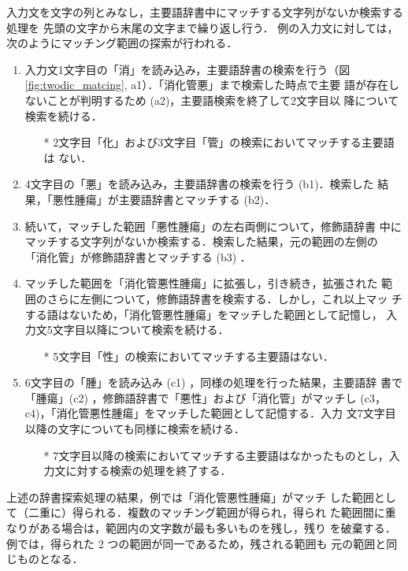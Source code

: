 \documentclass[japanese]{jnlp_1.4}
\begin{document}
入力文を文字の列とみなし，主要語辞書中にマッチする文字列がないか検索する処理を
先頭の文字から末尾の文字まで繰り返し行う．
例の入力文に対しては，次のようにマッチング範囲の探索が行われる．
\begin{enumerate}
\item 入力文1文字目の「消」を読み込み，主要語辞書の検索を行う（図 \ref{fig:twodic_matcing}, a1）．「消化管悪」まで検索した時点で主要
  語が存在しないことが判明するため (a2)，主要語検索を終了して2文字目以
  降について検索を続ける．
 \begin{itemize}
 \item[*] 2文字目「化」および3文字目「管」の検索においてマッチする主要語は
   ない．
 \end{itemize}
\item 4文字目の「悪」を読み込み，主要語辞書の検索を行う (b1)．検索した
  結果，「悪性腫瘍」が主要語辞書とマッチする (b2)．
\item 続いて，マッチした範囲「悪性腫瘍」の左右両側について，修飾語辞書
  中にマッチする文字列がないか検索する．検索した結果，元の範囲の左側の
  「消化管」が修飾語辞書とマッチする (b3) ．
\item マッチした範囲を「消化管悪性腫瘍」に拡張し，引き続き，拡張された
  範囲のさらに左側について，修飾語辞書を検索する．しかし，これ以上マッ
  チする語はないため，「消化管悪性腫瘍」をマッチした範囲として記憶し，
  入力文5文字目以降について検索を続ける．
 \begin{itemize}
 \item[*] 5文字目「性」の検索においてマッチする主要語はない．
 \end{itemize}
\item 6文字目の「腫」を読み込み (c1) ，同様の処理を行った結果，主要語辞
  書で「腫瘍」(c2) ，修飾語辞書で「悪性」および「消化管」がマッチし
  (c3，c4)，「消化管悪性腫瘍」をマッチした範囲として記憶する．入力
  文7文字目以降の文字についても同様に検索を続ける．
 \begin{itemize}
 \item[*] 7文字目以降の検索においてマッチする主要語はなかったものとし，入
   力文に対する検索の処理を終了する．
 \end{itemize}
\end{enumerate}
上述の辞書探索処理の結果，例では「消化管悪性腫瘍」がマッチ
した範囲として（二重に）得られる．複数のマッチング範囲が得られ，得られ
た範囲間に重なりがある場合は，範囲内の文字数が最も多いものを残し，残り
を破棄する．例では，得られた 2 つの範囲が同一であるため，残される範囲も
元の範囲と同じものとなる．
\end{document}
